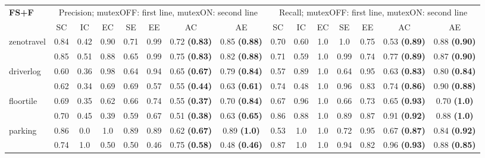 \documentclass{ecai}
\begin{document}
\begin{table*}
\begin{center}
{			\rule{0pt}{8pt}
			
			\begin{tabular}{lccccc|cc||ccccc|cc}
				\textbf{FS+F} & \multicolumn{7}{c}{Precision; mutexOFF: first line, mutexON: second line} & \multicolumn{7}{c}{Recall; mutexOFF: first line, mutexON: second line} 
				\\
				\cline{2-15}
				& SC & IC & EC & SE & EE & AC & AE & SC & IC & EC & SE & EE & AC & AE \\ 
				\cline{2-15}
				
				\multirow{2}{*}{zenotravel} & 0.84 &	0.42 &	0.90 &	0.71 &	0.99 &	0.72 \textbf{(0.83)} &	0.85 \textbf{(0.88)} & 0.70 &	0.60 &	1.0 &	1.0 &	0.75 &	0.53 \textbf{(0.89)} &	0.88 \textbf{(0.90)} \\
				& 0.85 &	0.51 &	0.88 &	0.65 &	0.99 &	0.75 \textbf{(0.83)} &	0.82 \textbf{(0.88)} &  0.71 &	0.59 &	1.0 &	0.99 &	0.74 &	0.77 \textbf{(0.89)} &	0.87 \textbf{(0.90)} \\
				
				\cline{2-15}
				
				\multirow{2}{*}{driverlog} & 0.60 &	0.36 &	0.98 &	0.64 &	0.94 &	0.65 \textbf{(0.67)} &	0.79 \textbf{(0.84)} & 0.57 &	0.89 &	1.0	& 0.64 &	0.95 &	0.63 \textbf{(0.83)} &	0.80 \textbf{(0.84)} \\
				& 0.62 &	0.34 &	0.69 &	0.69 &	0.57 &	0.55 \textbf{(0.44)} &	0.63 \textbf{(0.61)} & 0.74 &	0.48 &	1.0 &	0.96 &	0.83 &	0.74 \textbf{(0.86)} &	0.90 \textbf{(0.88)} \\
				
				
				\cline{2-15}
				
				\multirow{2}{*}{floortile} & 0.69 &	0.35 &	0.62 &	0.66 &	0.74 &	0.55 \textbf{(0.37)} &	0.70 \textbf{(0.84)} & 0.67	& 0.96 &	1.0 &	0.66 &	0.73 &	0.65 \textbf{(0.93)} &	0.70 \textbf{(1.0)} \\
				& 0.70 &	0.45 &	0.39 &	0.59 &	0.67 &	0.51 \textbf{(0.38)} &	0.63 \textbf{(0.65)} & 0.86 &	0.88 &	1.0 &	0.89 &	0.87 &	0.91 \textbf{(0.92)} &	0.88 \textbf{(1.0)} \\
				
				
				\cline{2-15}
				
				\multirow{2}{*}{parking} & 0.86	& 0.0	& 1.0 &	0.89 &	0.89 &	0.62 \textbf{(0.67)} &	0.89 \textbf{(1.0)} & 0.53 &	1.0 &	1.0	& 0.72 &	0.95 &	0.67 \textbf{(0.87)} &	0.84 \textbf{(0.92)} \\	
				& 0.74 &	1.0	& 0.50 &	0.50 &	0.46 &	0.75 \textbf{(0.58)} &	0.48 \textbf{(0.46)} & 0.87 &	1.0 &	1.0	& 0.94 &	0.82 &	0.96 \textbf{(0.93)} &	0.88 \textbf{(0.85)} \\
				
				\hline
			\end{tabular}
		}
	\label{table:SyntacticResults}
	\end{center}
\end{table*}
\end{document}
